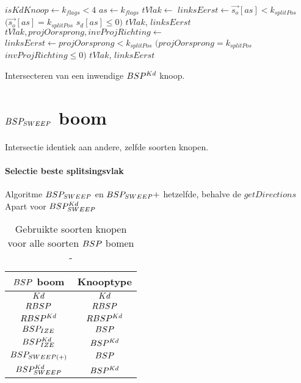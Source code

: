 \begin{dutchalgorithm}
    \begin{algorithmic}       
            \State $isKdKnoop \gets k_{flags} < 4$
                \State $as \gets k_{flags}$
                \State $tVlak \gets $ 
                \State $linksEerst \gets \vec{s_o}[as] < k_{splitPos}$ \Or $(\vec{s_o}[as] = k_{splitPos}$ \And $s_d[as] \leq 0)$
                \State \Return $tVlak$, $linksEerst$
            \Else
                \State $tVlak, projOorsprong, invProjRichting \gets $ 
                 \State $linksEerst \gets projOorsprong < k_{splitPos}$ \Or $(projOorsprong = k_{splitPos}$ \And $invProjRichting \leq 0)$
                \State \Return $tVlak$, $linksEerst$
            \EndIf
        \EndFunction
    \end{algorithmic}
    \caption{Intersecteren van een inwendige $BSP^{Kd}$ knoop.}
\end{dutchalgorithm}

\section{$BSP_{SWEEP}$ boom}
\label{sec:h4-bspsweep}
Intersectie identiek aan andere, zelfde soorten knopen.

\paragraph{Selectie beste splitsingsvlak}
Algoritme $BSP_{SWEEP}$ en $BSP_{SWEEP} +$ hetzelfde, behalve de $getDirections$
Apart voor $BSP^{Kd}_{SWEEP}$


\begin{table}
    \centering
    \begin{tabular}{@{}|c|c|@{}} \toprule      
    $\symBSP$ boom & Knooptype \\ \midrule
    $Kd$ & $Kd$ \\
    $RBSP$ & $RBSP$  \\
    $RBSP^{Kd}$ & $RBSP^{Kd}$  \\
    $BSP_{IZE}$ &  $\symBSP$ \\
    $BSP^{Kd}_{IZE}$ & $BSP^{Kd}$ \\
    $BSP_{SWEEP(+)}$ & $\symBSP$ \\
    $BSP^{Kd}_{SWEEP}$ & $BSP^{Kd}$ \\ \bottomrule
    \end{tabular}
    \caption[Gebruikte soorten knopen voor alle soorten $\symBSP$ bomen]{Gebruikte soorten knopen voor alle soorten $\symBSP$ bomen - \small}
    \label{tab:voorstelling-knoop-boom}
\end{table}

